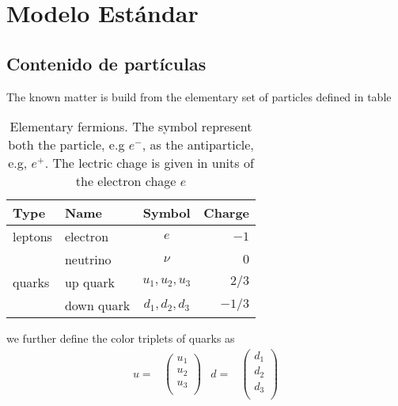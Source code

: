 \chapter{Modelo Est\'andar}
\label{cha:modelo-estandar} %

\section{Contenido de partículas}

\begin{frame}
The known matter is build from the elementary set of particles defined in table
\begin{table}
  \centering
  \begin{tabular}{l|l|c|r}
    Type &Name & Symbol&Charge\\\hline{}
   leptons& electron & $e$& $-1$\\
          & neutrino & $\nu$ & $0$\\\hline{}
   quarks &up quark & $u_1,u_2,u_3$ & $2/3$\\
          &down quark & $d_1,d_2,d_3$& $-1/3$\\
  \end{tabular}
  \caption{Elementary fermions. The symbol represent both the particle, e.g $e^-$, as the antiparticle, e.g, $e^+$. The lectric chage is given in units of the electron chage $e$  }
  \label{tab:ef}
\end{table}

we further define the color triplets of quarks as
\begin{align}
  u=&
  \begin{pmatrix}
    u_1 \\ u_2\\ u_3\\
  \end{pmatrix}
  &d=&
  \begin{pmatrix}
    d_1 \\ d_2 \\ d_3\\
  \end{pmatrix}
\end{align}



\end{frame}
